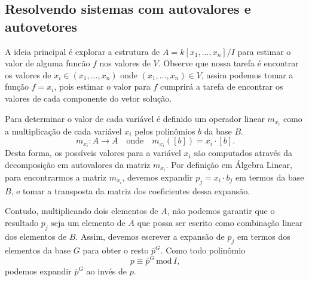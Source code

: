 \subsection*{Resolvendo sistemas com autovalores e autovetores}

A ideia principal é explorar a estrutura de $A=k[x_1,...,x_n]/I$ para estimar o valor de alguma funcão $f$ nos valores de $V$. Observe que nossa tarefa é encontrar os valores de $x_i\in (x_1,...,x_n)$ onde $(x_1,...,x_n)\in V$, assim podemos tomar a função $f=x_i$, pois estimar o valor para $f$ cumprirá a tarefa de encontrar os valores de cada componente do vetor solução.

Para determinar o valor de cada variável é definido um operador linear $m_{x_i}$ como a multiplicação de cada variável $x_i$ pelos polinômios $b$ da base $B$.
\begin{equation*}
m_{x_i}:A\rightarrow A\quad\text{onde}\quad m_{x_i}([b])=x_i\cdot[b].
\end{equation*} 
Desta forma, os possíveis valores para a variável $x_i$ são computados através da decomposição em autovalores da matriz $m_{x_i}$. Por definição em Álgebra Linear, para encontrarmos a matriz $m_{x_i}$,  devemos expandir $p_j=x_i\cdot b_j$ em termos da base $B$, e tomar a transposta da matriz dos coeficientes dessa expansão.

Contudo, multiplicando dois elementos de $A$, não podemos garantir que o resultado $p_j$ seja um elemento de $A$ que possa ser escrito como combinação linear dos elementos de $B$. Assim, devemos escrever a expansão de $p_j$ em termos dos elementos da base $G$ para obter o resto $\overline{p}^{G}$. Como todo polinômio
\begin{equation}\label{eq.resto-mod}
p\equiv\overline{p}^{G}\,\text{mod}\,I,
\end{equation} 
podemos expandir $\overline{p}^{G}$ ao invés de $p$. 

